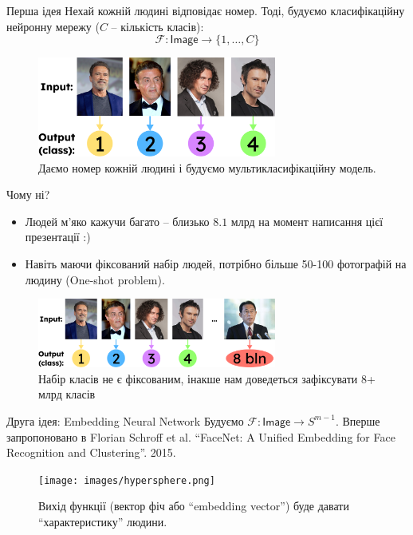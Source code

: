 \documentclass[xcolor={usenames,dvipsnames}]{beamer}
\begin{document}
    \begin{frame}{Перша ідея}
        Нехай кожній людині відповідає номер. Тоді, будуємо класифікаційну нейронну мережу ($C$ -- кількість класів):
        \begin{equation*}
            \mathcal{F}: \mathsf{Image} \to \{1,\dots,C\}
        \end{equation*}
        \begin{figure}
        \centering
            \includegraphics[width=0.7\textwidth]{images/recognition_classes.png}
            \caption{Даємо номер кожній людині і будуємо мультикласифікаційну модель.}
        \end{figure}
    \end{frame}

    \begin{frame}{Чому ні?}
        \begin{itemize}
            \item Людей м'яко кажучи багато -- близько $8.1$ млрд на момент написання цієї презентації :)
            \item Навіть маючи фіксований набір людей, потрібно більше 50-100 фотографій на людину (One-shot problem).
        \end{itemize}
        
        \begin{figure}
        \centering
            \includegraphics[width=0.7\textwidth]{images/too_many_people.png}
            \caption{Набір класів не є фіксованим, інакше нам доведеться зафіксувати 8+ млрд класів}
        \end{figure}
    \end{frame}

    \begin{frame}{Друга ідея: Embedding Neural Network}
        Будуємо $\mathcal{F}: \mathsf{Image} \to S^{m-1}$. Вперше запропоновано в Florian Schroff et al. ``FaceNet: A Unified Embedding for Face Recognition and Clustering''. 2015. 
        \begin{figure}
        \centering
            \texttt{[image: images/hypersphere.png]}
            \caption{Вихід функції (вектор фіч або ``embedding vector'') буде давати ``характеристику'' людини.}
        \end{figure}
    \end{frame}
\end{document}
